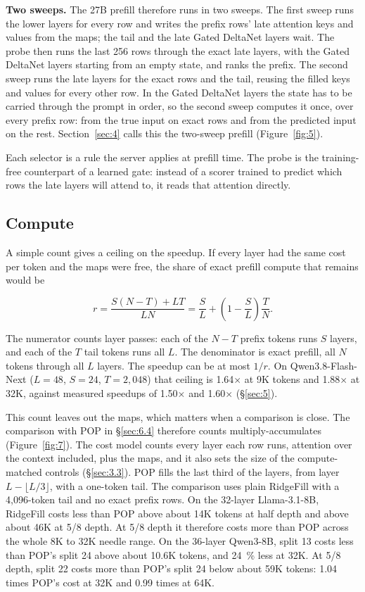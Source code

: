 \documentclass[11pt]{article}
\begin{document}
\textbf{Two sweeps.} The 27B prefill therefore runs in two sweeps. The first sweep runs the lower layers for every row and writes the prefix rows' late attention keys and values from the maps; the tail and the late Gated DeltaNet layers wait. The probe then runs the last 256 rows through the exact late layers, with the Gated DeltaNet layers starting from an empty state, and ranks the prefix. The second sweep runs the late layers for the exact rows and the tail, reusing the filled keys and values for every other row. In the Gated DeltaNet layers the state has to be carried through the prompt in order, so the second sweep computes it once, over every prefix row: from the true input on exact rows and from the predicted input on the rest. Section~\ref{sec:4} calls this the two-sweep prefill (Figure~\ref{fig:5}).

Each selector is a rule the server applies at prefill time. The probe is the training-free counterpart of a learned gate: instead of a scorer trained to predict which rows the late layers will attend to, it reads that attention directly.


\subsection{Compute}\label{sec:2.5}
A simple count gives a ceiling on the speedup. If every layer had the same cost per token and the maps were free, the share of exact prefill compute that remains would be

\[r = \frac{S(N-T) + LT}{LN} = \frac{S}{L} + \left(1 - \frac{S}{L}\right)\frac{T}{N}.\]

The numerator counts layer passes: each of the $N - T$ prefix tokens runs $S$ layers, and each of the $T$ tail tokens runs all $L$. The denominator is exact prefill, all $N$ tokens through all $L$ layers. The speedup can be at most $1/r$. On Qwen3.8-Flash-Next ($L = 48$, $S = 24$, $T = 2{,}048$) that ceiling is 1.64$\times$ at 9K tokens and 1.88$\times$ at 32K, against measured speedups of 1.50$\times$ and 1.60$\times$ (\S\ref{sec:5}).

This count leaves out the maps, which matters when a comparison is close. The comparison with POP in \S\ref{sec:6.4} therefore counts multiply-accumulates (Figure~\ref{fig:7}). The cost model counts every layer each row runs, attention over the context included, plus the maps, and it also sets the size of the compute-matched controls (\S\ref{sec:3.3}). POP fills the last third of the layers, from layer $L - \lfloor L/3 \rfloor$, with a one-token tail. The comparison uses plain RidgeFill with a 4,096-token tail and no exact prefix rows. On the 32-layer Llama-3.1-8B, RidgeFill costs less than POP above about 14K tokens at half depth and above about 46K at 5/8 depth. At 5/8 depth it therefore costs more than POP across the whole 8K to 32K needle range. On the 36-layer Qwen3-8B, split 13 costs less than POP's split 24 above about 10.6K tokens, and 24~\% less at 32K. At 5/8 depth, split 22 costs more than POP's split 24 below about 59K tokens: 1.04 times POP's cost at 32K and 0.99 times at 64K.
\end{document}
